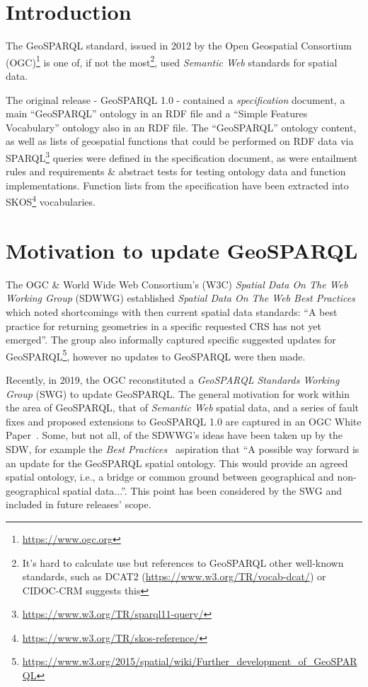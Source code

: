 \documentclass[runningheads]{llncs}
\begin{document}
\section{Introduction}\label{sec:introduction}
The GeoSPARQL standard, issued in 2012 by the Open Geospatial Consortium (OGC)\footnote{\url{https://www.ogc.org}} 
is one of, if not the most\footnote{It's hard to calculate use but references to GeoSPARQL other well-known standards, 
such as DCAT2 (\url{https://www.w3.org/TR/vocab-dcat/}) or CIDOC-CRM \cite{doerr2013crmgeo} suggests this}, used \textit{Semantic Web} standards for 
spatial data.

The original release - GeoSPARQL 1.0 - contained a \textit{specification} document,
a main ``GeoSPARQL'' ontology in an RDF file and a ``Simple Features Vocabulary'' ontology also in an RDF file. The 
``GeoSPARQL'' ontology content, as well as lists of geospatial functions that could be performed on RDF data via 
SPARQL\footnote{\url{https://www.w3.org/TR/sparql11-query/}} queries were defined in the specification document, as
were entailment rules and requirements \& abstract tests for testing ontology data and function implementations. 
Function lists from the specification have been extracted into SKOS\footnote{\url{https://www.w3.org/TR/skos-reference/}}
vocabularies.


\section{Motivation to update GeoSPARQL}\label{sec:motivation}
The OGC \& World Wide Web Consortium's (W3C) \textit{Spatial Data On The Web Working Group}
(SDWWG) established \textit{Spatial Data On The Web Best Practices}~\cite{van_den_brink_best_2018} which noted 
shortcomings with then current spatial data standards: ``A best practice for returning geometries in a 
specific requested CRS has not yet emerged''. The group also informally captured specific suggested updates for 
GeoSPARQL\footnote{\url{https://www.w3.org/2015/spatial/wiki/Further_development_of_GeoSPARQL}}, however no updates 
to GeoSPARQL were then made.

Recently, in 2019, the OGC reconstituted a \textit{GeoSPARQL Standards Working Group} (SWG) to update GeoSPARQL. The general 
motivation for work within the area of GeoSPARQL, that of \textit{Semantic Web} spatial data, and a series of
fault fixes and proposed extensions to GeoSPARQL 1.0 are captured in an OGC White Paper~\cite{geosparqlwhitepaper}. Some,
but not all, of the SDWWG's ideas have been taken up by the SDW, for example the \textit{Best Practices}~\cite{van_den_brink_best_2018}
aspiration that ``A possible way forward is an update for the GeoSPARQL spatial ontology. This would provide an 
agreed spatial ontology, i.e., a bridge or common ground between geographical and non-geographical spatial data...''.
This point has been considered by the SWG and included in future releases' scope. 
\end{document}
